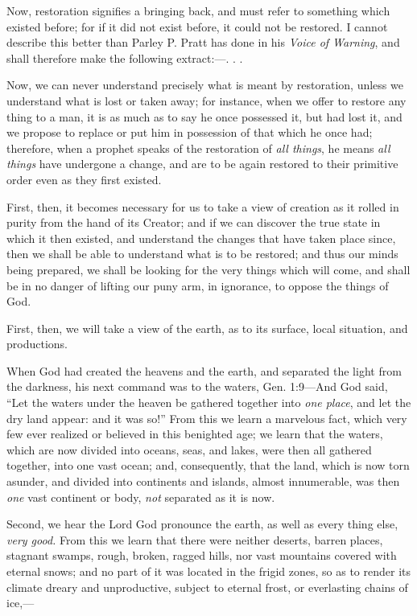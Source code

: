 Now, restoration signifies a bringing back, and must refer to something which existed before;
for if it did not exist before, it could not be restored. I cannot describe this better than Parley
P. Pratt has done in his \textit{Voice of Warning}, and shall therefore make the following extract:—. .
.

Now, we can never understand precisely what is meant by restoration, unless we understand
what is lost or taken away; for instance, when we offer to restore any thing to a man, it is as
much as to say he once possessed it, but had lost it, and we propose to replace or put him in
possession of that which he once had; therefore, when a prophet speaks of the restoration of
\textit{all things}, he means \textit{all things} have undergone a change, and are to be again restored to their
primitive order even as they first existed.

First, then, it becomes necessary for us to take a view of creation as it rolled in purity from
the hand of its Creator; and if we can discover the true state in which it then existed, and
understand the changes that have taken place since, then we shall be able to understand what
is to be restored; and thus our minds being prepared, we shall be looking for the very things
which will come, and shall be in no danger of lifting our puny arm, in ignorance, to oppose
the things of God.

First, then, we will take a view of the earth, as to its surface, local situation, and productions.

When God had created the heavens and the earth, and separated the light from the darkness,
his next command was to the waters, Gen. 1:9—And God said, ``Let the waters under the
heaven be gathered together into \textit{one place}, and let the dry land appear: and it was so!'' From
this we learn a marvelous fact, which very few ever realized or believed in this benighted
age; we learn that the waters, which are now divided into oceans, seas, and lakes, were then
all gathered together, into one vast ocean; and, consequently, that the land, which is now torn
asunder, and divided into continents and islands, almost innumerable, was then \textit{one} vast
continent or body, \textit{not} separated as it is now.

Second, we hear the Lord God pronounce the earth, as well as every thing else, \textit{very good.}
From this we learn that there were neither deserts, barren places, stagnant swamps, rough,
broken, ragged hills, nor vast mountains covered with eternal snows; and no part of it was
located in the frigid zones, so as to render its climate dreary and unproductive, subject to
eternal frost, or everlasting chains of ice,—

